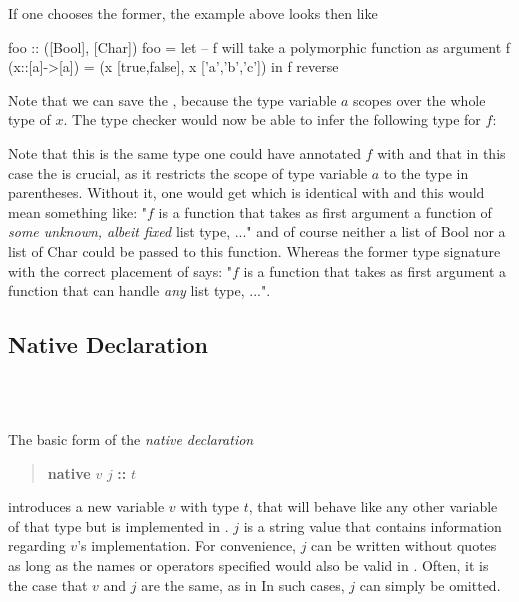 If one chooses the former, the example above looks then like

\begin{code}
foo :: ([Bool], [Char])
foo = let
        -- f will take a polymorphic function as argument
        f (x::[a]->[a]) = (x [true,false], x ['a','b','c'])
    in f reverse
\end{code}

Note that we can save the , because the type variable $a$ scopes over the whole type of $x$.
The type checker would now be able to infer the following type for $f$:

Note that this is the same type one could have annotated $f$ with and that in this case the  is crucial, as it restricts the scope of type variable $a$ to the type in parentheses. Without it, one would get
which is identical with
and this would mean something like: "$f$ is a function that takes as first argument a function of \emph{some unknown, albeit fixed} list type, ..." and of course neither a list of Bool nor a list of Char could be passed to this function. Whereas the former type signature with the correct placement of  says: "$f$ is a function that takes as first argument a function that can handle \emph{any} list type, ...".


\subsection{Native  Declaration} \label{nativefun}

\begin{flushleft}
     \sym{::}  \\
  \oder{}  \oder{}  \oder{} \\
  
\end{flushleft}

The basic form of the \emph{native declaration}
\begin{quote}
\textbf{native} $v$  $j$ \textbf{::} $t$
\end{quote}
introduces a new variable $v$ with type $t$, that will behave like any other \frege{} variable of that type but is implemented in \java{}. $j$ is a string value that contains information regarding $v$'s \java{} implementation. For convenience, $j$ can be written without quotes as long as the names or operators specified would also be valid in \frege{}. Often, it is the case that $v$ and $j$ are the same, as in 
In such cases, $j$ can simply be omitted.

